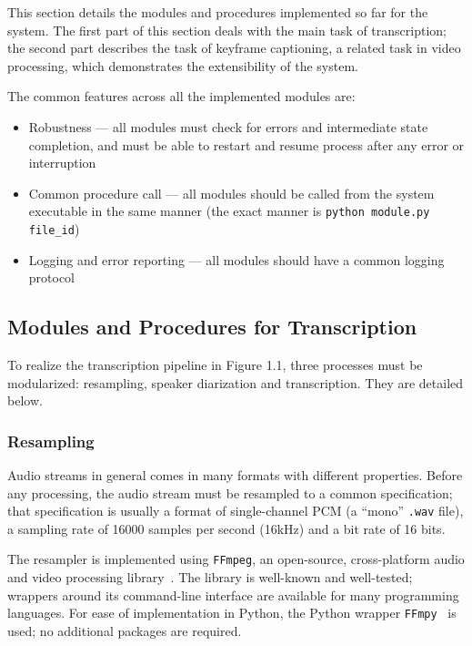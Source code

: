 This section details the modules and procedures implemented so far for the system.
The first part of this section deals with the main task of transcription; the second
part describes the task of keyframe captioning, a related task in video processing,
which demonstrates the extensibility of the system.

The common features across all the implemented modules are:

\begin{itemize}
    \item Robustness --- all modules must check for errors and intermediate state
    completion, and must be able to restart and resume process after any error or
    interruption
    \item Common procedure call --- all modules should be called from the system
    executable in the same manner (the exact manner is
    \texttt{python module.py file\_id})
    \item Logging and error reporting --- all modules should have a common logging
    protocol
\end{itemize}

\subsection{Modules and Procedures for Transcription}

To realize the transcription pipeline in Figure 1.1, three processes must be
modularized: resampling, speaker diarization and transcription. They are detailed
below.

\subsubsection{Resampling}

Audio streams in general comes in many formats with different properties. Before
any processing, the audio stream must be resampled to a common specification; that
specification is usually a format of single-channel PCM (a ``mono'' \texttt{.wav}
file), a sampling rate of 16000 samples per second (16kHz) and a bit rate of 16 bits.

The resampler is implemented using \texttt{FFmpeg}, an open-source, cross-platform
audio and video processing library~\cite{ffmpeg}. The library is well-known and 
well-tested; wrappers around its command-line interface are available for many 
programming languages. For ease of implementation in Python, the Python wrapper
\texttt{FFmpy}~\cite{ffmpy} is used; no additional packages are required.

